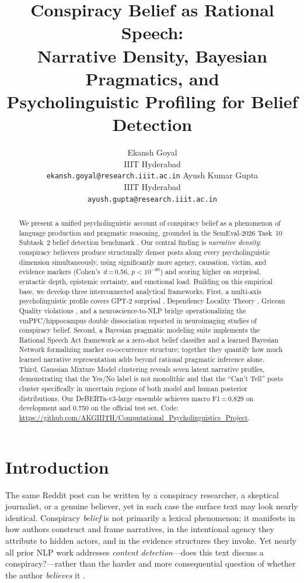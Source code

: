 \documentclass[11pt]{article}
\title{Conspiracy Belief as Rational Speech:\\
Narrative Density, Bayesian Pragmatics, and\\
Psycholinguistic Profiling for Belief Detection}
\author{Ekansh Goyal \\
  IIIT Hyderabad \\
  \texttt{ekansh.goyal@research.iiit.ac.in}
  \And
  Ayush Kumar Gupta \\
  IIIT Hyderabad \\
  \texttt{ayush.gupta@research.iiit.ac.in}}
\begin{document}
\maketitle

\begin{abstract}
We present a unified psycholinguistic account of conspiracy belief as a
phenomenon of language production and pragmatic reasoning, grounded in
the SemEval-2026 Task~10 Subtask~2 belief detection benchmark
\citep{samory-etal-2026-semeval}.
Our central finding is \emph{narrative density}: conspiracy believers
produce structurally denser posts along every psycholinguistic dimension
simultaneously, using significantly more agency, causation, victim, and
evidence markers (Cohen's~$d$\,=\,0.56, $p < 10^{-80}$) and scoring
higher on surprisal, syntactic depth, epistemic certainty, and emotional
load.
Building on this empirical base, we develop three interconnected analytical
frameworks.
First, a multi-axis psycholinguistic profile covers GPT-2 surprisal
\citep{levy2008expectation}, Dependency Locality Theory
\citep{gibson1998linguistic}, Gricean Quality violations
\citep{grice1975logic}, and a neuroscience-to-NLP bridge operationalizing
the vmPFC/hippocampus double dissociation reported in neuroimaging studies
of conspiracy belief.
Second, a Bayesian pragmatic modeling suite implements the Rational Speech
Act framework \citep{goodman2016pragmatics} as a zero-shot belief
classifier and a learned Bayesian Network formalizing marker
co-occurrence structure; together they quantify how much learned
narrative representation adds beyond rational pragmatic inference alone.
Third, Gaussian Mixture Model clustering reveals seven latent narrative
profiles, demonstrating that the Yes/No label is not monolithic and
that the ``Can't Tell'' posts cluster specifically in uncertain regions
of both model and human posterior distributions.
Our DeBERTa-v3-large ensemble achieves macro F1\,=\,0.829 on development
and 0.750 on the official test set.
Code: \url{https://github.com/AKGIIITH/Computational_Psycholinguistics_Project}.
\end{abstract}

\section{Introduction}
\label{sec:intro}

The same Reddit post can be written by a conspiracy researcher, a
skeptical journalist, or a genuine believer, yet in each case the
surface text may look nearly identical.
Conspiracy \emph{belief} is not primarily a lexical phenomenon: it
manifests in how authors construct and frame narratives, in the intentional
agency they attribute to hidden actors, and in the evidence structures they
invoke.
Yet nearly all prior NLP work addresses \emph{content detection}---does
this text discuss a conspiracy?---rather than the harder and more
consequential question of whether the author \emph{believes}
it \citep{miani2021loco,bessi2015science}.
\end{document}
